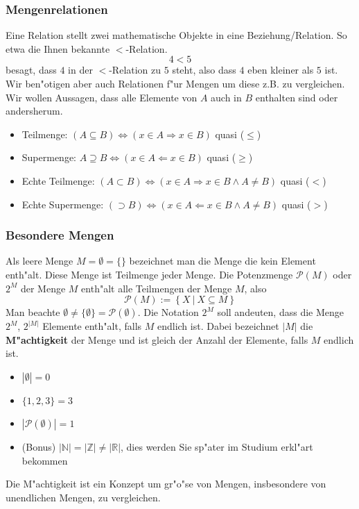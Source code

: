 \subsubsection{Mengenrelationen}
Eine Relation stellt zwei mathematische Objekte in eine Beziehung/Relation. So etwa die Ihnen bekannte $<$-Relation.
\begin{equation*}
4 < 5
\end{equation*}
besagt, dass $4$ in der $<$-Relation zu $5$ steht, also dass $4$ eben kleiner als $5$ ist. Wir ben"otigen aber auch Relationen f"ur Mengen um diese z.B. zu vergleichen. Wir wollen Aussagen, dass alle Elemente von $A$ auch in $B$ enthalten sind oder andersherum.
\begin{itemize}
\item Teilmenge: $(A \subseteq B) \iff (x \in A \Rightarrow x \in B)$ quasi ($\leq$)
\item Supermenge: $A \supseteq B  \iff (x \in A \Leftarrow x \in B)$ quasi ($\geq$)
\item Echte Teilmenge: $(A \subset B) \iff (x \in A \Rightarrow x \in B \land A \neq B)$ quasi ($<$)
\item Echte Supermenge: $(\supset B) \iff (x \in A \Leftarrow x \in B \land A \neq B)$ quasi ($>$)
\end{itemize}

\subsubsection{Besondere Mengen}
Als leere Menge $M = \emptyset = \{\}$ bezeichnet man die Menge die kein Element enth"alt. Diese Menge ist Teilmenge jeder Menge. Die Potenzmenge $\mathcal{P}(M)$ oder $2^M$ der Menge $M$ enth"alt alle Teilmengen der Menge $M$, also
\begin{equation*}
\mathcal{P}(M) := \left\{X \ | \ X \subseteq M \right\}
\end{equation*}
Man beachte $\emptyset \neq \{ \emptyset \} = \mathcal{P}(\emptyset)$. Die Notation $2^M$ soll andeuten, dass die Menge $2^M$, $2^{|M|}$ Elemente enth"alt, falls $M$ endlich ist. Dabei bezeichnet $|M|$ die \textbf{M"achtigkeit} der Menge und ist gleich der Anzahl der Elemente, falls $M$ endlich ist.
\begin{itemize}
\item $|\emptyset| = 0$
\item $\{1, 2, 3\} = 3$
\item $|\mathcal{P}(\emptyset)| = 1$
\item (Bonus) $|\mathbb{N}| = |\mathbb{Z}| \neq |\mathbb{R}|$, dies werden Sie sp"ater im Studium erkl"art bekommen
\end{itemize}
 Die M"achtigkeit ist ein Konzept um gr"o"se von Mengen, insbesondere von unendlichen Mengen, zu vergleichen.